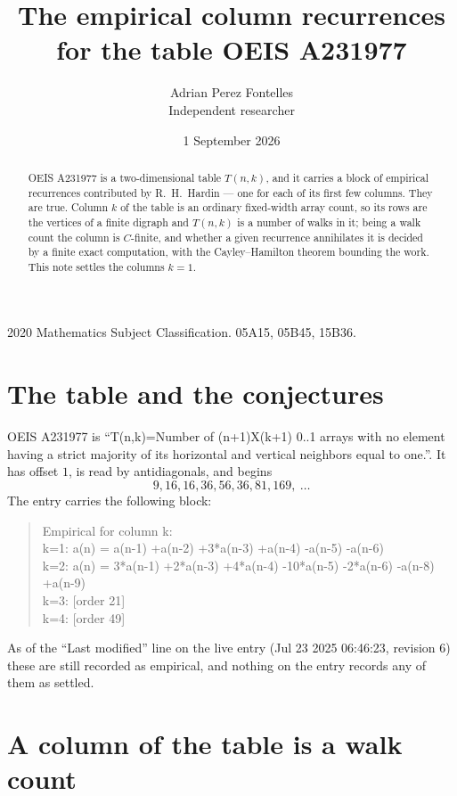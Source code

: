 \documentclass[11pt,a4paper]{article}
\title{The empirical column recurrences for the table OEIS A231977}
\author{Adrian Perez Fontelles\\ \small Independent researcher}
\date{1 September 2026}
\theoremstyle{plain}
\theoremstyle{definition}
\begin{document}
\maketitle

\begin{abstract}
OEIS A231977 is a two-dimensional table $T(n,k)$, and it carries a block of empirical
recurrences contributed by R.~H.~Hardin --- one for each of its first few columns. They are
true. Column $k$ of the table is an ordinary fixed-width array count, so its rows are the
vertices of a finite digraph and $T(n,k)$ is a number of walks in it; being a walk count the
column is $C$-finite, and whether a given recurrence annihilates it is decided by a finite
exact computation, with the Cayley--Hamilton theorem bounding the work. This note settles the columns $k=1$.
\end{abstract}

\noindent\small 2020 Mathematics Subject Classification. 05A15, 05B45, 15B36.\normalsize

\section{The table and the conjectures}

OEIS A231977 is ``T(n,k)=Number of (n+1)X(k+1) 0..1 arrays with no element having a strict majority of its horizontal and vertical neighbors equal to one.''. It has offset $1$, is
read by antidiagonals, and begins
\[
9, 16, 16, 36, 56, 36, 81, 169,\ \dots
\]
The entry carries the following block:
\begin{quote}\small
Empirical for column k:\\
k=1: a(n) = a(n-1) +a(n-2) +3*a(n-3) +a(n-4) -a(n-5) -a(n-6)\\
k=2: a(n) = 3*a(n-1) +2*a(n-3) +4*a(n-4) -10*a(n-5) -2*a(n-6) -a(n-8) +a(n-9)\\
k=3: [order 21]\\
k=4: [order 49]\\
\end{quote}
As of the ``Last modified'' line on the live entry (Jul 23 2025 06:46:23, revision 6) these are still
recorded as empirical, and nothing on the entry records any of them as settled.

\section{A column of the table is a walk count}
\end{document}
